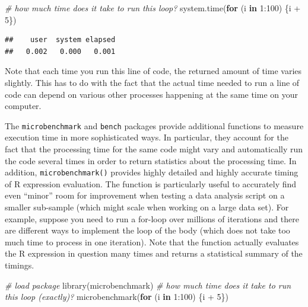 \documentclass[
  12pt,
]{style/krantz}
\newenvironment{Shaded}{\begin{snugshade}}{\end{snugshade}}
\newcommand{\CommentTok}[1]{\textcolor[rgb]{0.56,0.35,0.01}{\textit{#1}}}
\newcommand{\ControlFlowTok}[1]{\textcolor[rgb]{0.13,0.29,0.53}{\textbf{#1}}}
\newcommand{\DecValTok}[1]{\textcolor[rgb]{0.00,0.00,0.81}{#1}}
\newcommand{\FunctionTok}[1]{\textcolor[rgb]{0.00,0.00,0.00}{#1}}
\newcommand{\NormalTok}[1]{#1}
\newcommand{\SpecialCharTok}[1]{\textcolor[rgb]{0.00,0.00,0.00}{#1}}
\begin{document}
\begin{Shaded}
\begin{Highlighting}[]
\CommentTok{\# how much time does it take to run this loop?}
\FunctionTok{system.time}\NormalTok{(}\ControlFlowTok{for}\NormalTok{ (i }\ControlFlowTok{in} \DecValTok{1}\SpecialCharTok{:}\DecValTok{100}\NormalTok{) \{i }\SpecialCharTok{+} \DecValTok{5}\NormalTok{\})}
\end{Highlighting}
\end{Shaded}

\begin{verbatim}
##    user  system elapsed 
##   0.002   0.000   0.001
\end{verbatim}

Note that each time you run this line of code, the returned amount of time varies slightly. This has to do with the fact that the actual time needed to run a line of code can depend on various other processes happening at the same time on your computer.

The \texttt{microbenchmark} and \texttt{bench} packages provide additional functions to measure execution time in more sophisticated ways. In particular, they account for the fact that the processing time for the same code might vary and automatically run the code several times in order to return statistics about the processing time. In addition, \texttt{microbenchmark()} provides highly detailed and highly accurate timing of R expression evaluation. The function is particularly useful to accurately find even ``minor'' room for improvement when testing a data analysis script on a smaller sub-sample (which might scale when working on a large data set). For example, suppose you need to run a for-loop over millions of iterations and there are different ways to implement the loop of the body (which does not take too much time to process in one iteration). Note that the function actually evaluates the R expression in question many times and returns a statistical summary of the timings.

\begin{Shaded}
\begin{Highlighting}[]
\CommentTok{\# load package}
\FunctionTok{library}\NormalTok{(microbenchmark)}
\CommentTok{\# how much time does it take to run this loop (exactly)?}
\FunctionTok{microbenchmark}\NormalTok{(}\ControlFlowTok{for}\NormalTok{ (i }\ControlFlowTok{in} \DecValTok{1}\SpecialCharTok{:}\DecValTok{100}\NormalTok{) \{i }\SpecialCharTok{+} \DecValTok{5}\NormalTok{\})}
\end{Highlighting}
\end{Shaded}
\end{document}
